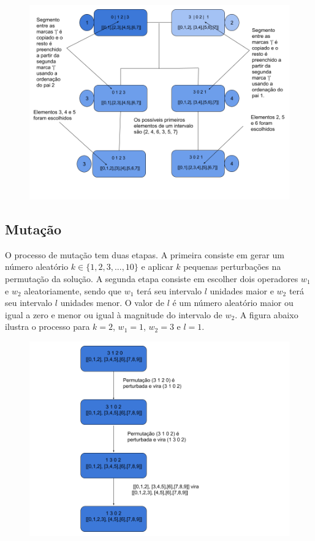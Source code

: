 \documentclass{article}
\begin{document}
\begin{figure}[H]

\centering
\includegraphics[scale=0.30]{figure2}
\end{figure}

\subsection{Mutação}
O processo de mutação tem duas etapas. A primeira consiste em gerar um número aleatório $k\in \{1, 2, 3,...,10\}$ e aplicar $k$ pequenas perturbações na permutação da solução. A segunda etapa consiste em escolher dois operadores $w_{1}$ e $w_{2}$ aleatoriamente, sendo que $w_{1}$ terá seu intervalo $l$ unidades maior e $w_{2}$ terá seu intervalo $l$ unidades menor. O valor de $l$ é um número aleatório maior ou igual a zero e menor ou igual à  magnitude do intervalo de $w_{2}$. A figura abaixo ilustra o processo para $k=2$, $w_{1} = 1$, $w_{2} = 3$ e $l=1$.

\begin{figure}[H]
\centering
\includegraphics[scale=0.30]{figure3}
\end{figure}
\end{document}
